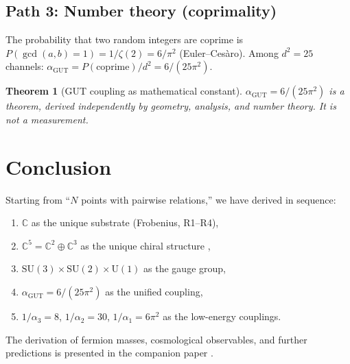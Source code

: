 \documentclass[12pt]{amsart}
\newtheorem{theorem}{Theorem}[section]
\theoremstyle{definition}
\theoremstyle{remark}
\newcommand{\CC}{\mathbb{C}}
\newcommand{\agut}{\alpha_{\mathrm{GUT}}}
\begin{document}
\subsection{Path 3: Number theory (coprimality)}

The probability that two random integers
are coprime is
$P(\gcd(a,b) = 1) = 1/\zeta(2) = 6/\pi^2$
(Euler--Ces\`aro).
Among $d^2 = 25$ channels:
$\agut = P(\text{coprime})/d^2 = 6/(25\pi^2)$.

\begin{theorem}[GUT coupling as mathematical constant]
\label{thm:agut}
$\agut = 6/(25\pi^2)$ is a theorem,
derived independently by geometry,
analysis, and number theory.
It is not a measurement.
\end{theorem}

\section{Conclusion}

Starting from ``$N$ points with pairwise
relations,'' we have derived in sequence:
\begin{enumerate}
\item $\CC$ as the unique substrate
  (Frobenius, R1--R4),
\item $\CC^5 = \CC^2 \oplus \CC^3$ as the
  unique chiral structure \cite{Paper1},
\item $\mathrm{SU}(3) \times \mathrm{SU}(2)
  \times \mathrm{U}(1)$ as the gauge group,
\item $\agut = 6/(25\pi^2)$ as the unified coupling,
\item $1/\alpha_3 = 8$,\;
  $1/\alpha_2 = 30$,\;
  $1/\alpha_1 = 6\pi^2$
  as the low-energy couplings.
\end{enumerate}

The derivation of fermion masses,
cosmological observables, and further
predictions is presented in the
companion paper \cite{Paper3}.
\end{document}
